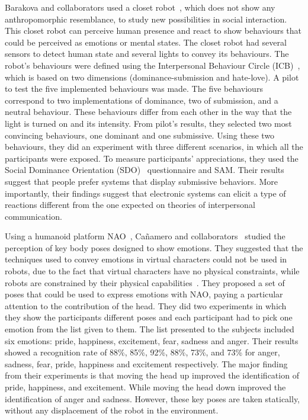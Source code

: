 Barakova and collaborators used a closet robot~\cite{Barakova2013}, which does not show any anthropomorphic resemblance, to study new possibilities in social interaction. This closet robot can perceive human presence and react to show behaviours that could be perceived as emotions or mental states. The closet robot had several sensors to detect human state and several lights to convey its behaviours. The robot's behaviours were defined using the Interpersonal Behaviour Circle (ICB)~\cite{Leary57}, which is based on two dimensions (dominance-submission and hate-love). A pilot to test the five implemented behaviours was made. The five behaviours correspond to two implementations of dominance, two of submission, and a neutral behaviour. These behaviours differ from each other in the way that the light is turned on and its intensity. From pilot's results, they selected two most convincing behaviours, one dominant and one submissive. Using these two behaviours, they did an experiment with three different scenarios, in which all the participants were exposed. To measure participants' appreciations, they used the Social Dominance Orientation (SDO)~\cite{ pratto1994social} questionnaire and SAM. Their results suggest that people prefer systems that display submissive behaviors. More importantly, their findings suggest that electronic systems can elicit a type of reactions different from the one expected on theories of interpersonal communication.

Using a humanoid platform NAO~\cite{NAO2013}, Ca\~namero and collaborators~\cite{Canamero2010,Beck2010} studied the perception of key body poses designed to show emotions. They suggested that the techniques used to convey emotions in virtual characters could not be used in robots, due to the fact that virtual characters have no physical constraints, while robots are constrained by their physical capabilities~\cite{Saerbeck2007, Canamero2010}. They proposed a set of poses that could be used to express emotions with NAO, paying a particular attention to the contribution of the head. They did two experiments in which they show the participants different poses and each participant had to pick one emotion from the list given to them. The list presented to the subjects included six emotions: pride, happiness, excitement, fear, sadness and anger. Their results showed a recognition rate of 88\%, 85\%, 92\%, 88\%, 73\%, and 73\% for anger, sadness, fear, pride, happiness and excitement respectively. The major finding from their experiments is that moving the head up improved the identification of pride, happiness, and excitement. While moving the head down improved the identification of anger and sadness. However, these key poses are taken statically, without any displacement of the robot in the environment.

